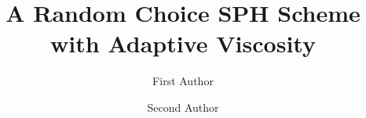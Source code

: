 %
%
%
%
%
\RequirePackage{fix-cm}
%
\documentclass{svjour3}                     %
%
\smartqed  %
%
\usepackage{graphicx}
%
\usepackage{mathptmx}      %
%
\usepackage{amsmath}
\usepackage{float}
\usepackage[square,sort,comma,numbers]{natbib}
\usepackage{latexsym}
%
%
%


\title{A Random Choice SPH Scheme with Adaptive Viscosity%
}


\author{First Author         \and
        Second Author %
}

